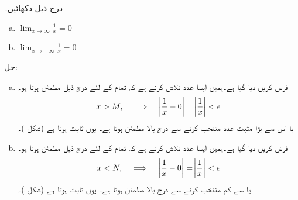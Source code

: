 درج ذیل دکھائیں۔
\begin{multicols}{2}
\begin{enumerate}[a.]
\item
$\lim_{x\to\infty}\frac{1}{x}=0$
\item
$\lim_{x\to -\infty}\frac{1}{x}=0$
\end{enumerate}
\end{multicols}
حل:
\begin{enumerate}[a.]
\item
فرض کریں  دیا گیا ہے۔ہمیں ایسا عدد  تلاش کرنے ہے کہ تمام  کے لئے درج ذیل مطمئن ہوتا ہو۔
\begin{align*}
x>M,\quad \implies \quad \abs{\frac{1}{x}-0}=\abs{\frac{1}{x}}<\epsilon
\end{align*}
 یا اس سے بڑا مثبت عدد منتخب کرنے سے درج بالا مطمئن ہوتا ہے۔ یوں  ثابت ہوتا ہے (شکل )۔
\item
فرض کریں  دیا گیا ہے۔ہمیں ایسا عدد  تلاش کرنے ہے کہ تمام  کے لئے درج ذیل مطمئن ہوتا ہو۔
\begin{align*}
x<N,\quad \implies \quad \abs{\frac{1}{x}-0}=\abs{\frac{1}{x}}<\epsilon
\end{align*}
 یا  سے کم منتخب کرنے سے درج بالا مطمئن ہوتا ہے۔ یوں  ثابت ہوتا ہے (شکل )۔
\end{enumerate}
%
